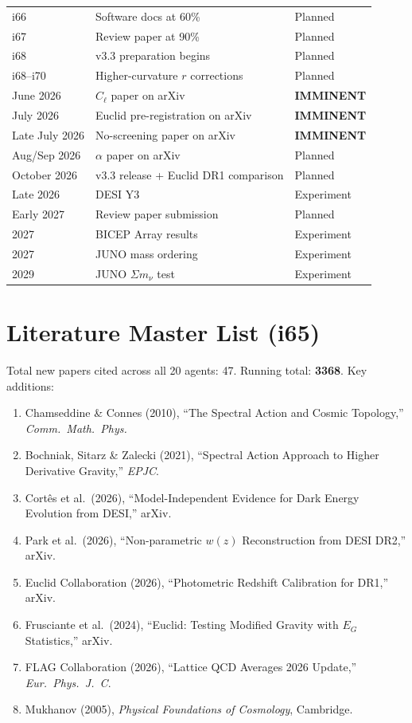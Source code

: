 \documentclass[11pt,a4paper]{article}
\begin{document}
\begin{center}
\begin{longtable}{lll}
i66 & Software docs at 60\% & Planned \\
i67 & Review paper at 90\% & Planned \\
i68 & v3.3 preparation begins & Planned \\
i68--i70 & Higher-curvature $r$ corrections & Planned \\
\midrule
June 2026 & $C_\ell$ paper on arXiv & \textbf{IMMINENT} \\
July 2026 & Euclid pre-registration on arXiv & \textbf{IMMINENT} \\
Late July 2026 & No-screening paper on arXiv & \textbf{IMMINENT} \\
Aug/Sep 2026 & $\alpha$ paper on arXiv & Planned \\
October 2026 & v3.3 release + Euclid DR1 comparison & Planned \\
Late 2026 & DESI Y3 & Experiment \\
Early 2027 & Review paper submission & Planned \\
2027 & BICEP Array results & Experiment \\
2027 & JUNO mass ordering & Experiment \\
2029 & JUNO $\Sigma m_\nu$ test & Experiment \\
\bottomrule
\end{longtable}
\end{center}


\section{Literature Master List (i65)}
\label{sec:literature}

Total new papers cited across all 20 agents: 47. Running total: \textbf{3368}. Key additions:

\begin{enumerate}
\item Chamseddine \& Connes (2010), ``The Spectral Action and Cosmic Topology,'' \textit{Comm.\ Math.\ Phys.}
\item Bochniak, Sitarz \& Zalecki (2021), ``Spectral Action Approach to Higher Derivative Gravity,'' \textit{EPJC}.
\item Cort\^{e}s et al.\ (2026), ``Model-Independent Evidence for Dark Energy Evolution from DESI,'' arXiv.
\item Park et al.\ (2026), ``Non-parametric $w(z)$ Reconstruction from DESI DR2,'' arXiv.
\item Euclid Collaboration (2026), ``Photometric Redshift Calibration for DR1,'' arXiv.
\item Frusciante et al.\ (2024), ``Euclid: Testing Modified Gravity with $E_G$ Statistics,'' arXiv.
\item FLAG Collaboration (2026), ``Lattice QCD Averages 2026 Update,'' \textit{Eur.\ Phys.\ J.\ C}.
\item Mukhanov (2005), \textit{Physical Foundations of Cosmology}, Cambridge.
\end{enumerate}
\end{document}
